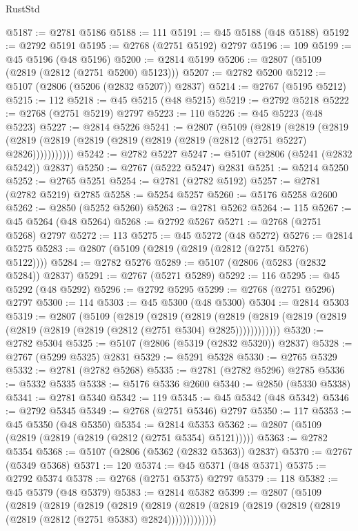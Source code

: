 \begin{lexlean}{RustStd}
\begin{coremodule}
@5187 := @2781 @5186
@5188 := 111
@5191 := @45 @5188 (@48 @5188)
@5192 := @2792 @5191
@5195 := @2768 (@2751 @5192) @2797
@5196 := 109
@5199 := @45 @5196 (@48 @5196)
@5200 := @2814 @5199
@5206 := @2807 (@5109 (@2819 (@2812 (@2751 @5200) @5123)))
@5207 := @2782 @5200
@5212 := @5107 (@2806 (@5206 (@2832 @5207)) @2837)
@5214 := @2767 (@5195 @5212)
@5215 := 112
@5218 := @45 @5215 (@48 @5215)
@5219 := @2792 @5218
@5222 := @2768 (@2751 @5219) @2797
@5223 := 110
@5226 := @45 @5223 (@48 @5223)
@5227 := @2814 @5226
@5241 := @2807
    (@5109
      (@2819
        (@2819
          (@2819 (@2819 (@2819 (@2819 (@2819 (@2819 (@2819 (@2812 (@2751 @5227) @2826)))))))))))
@5242 := @2782 @5227
@5247 := @5107 (@2806 (@5241 (@2832 @5242)) @2837)
@5250 := @2767 (@5222 @5247) @2831
@5251 := @5214 @5250
@5252 := @2765 @5251
@5254 := @2781 (@2782 @5192)
@5257 := @2781 (@2782 @5219) @2785
@5258 := @5254 @5257
@5260 := @5176 @5258 @2600
@5262 := @2850 (@5252 @5260)
@5263 := @2781 @5262
@5264 := 115
@5267 := @45 @5264 (@48 @5264)
@5268 := @2792 @5267
@5271 := @2768 (@2751 @5268) @2797
@5272 := 113
@5275 := @45 @5272 (@48 @5272)
@5276 := @2814 @5275
@5283 := @2807 (@5109 (@2819 (@2819 (@2812 (@2751 @5276) @5122))))
@5284 := @2782 @5276
@5289 := @5107 (@2806 (@5283 (@2832 @5284)) @2837)
@5291 := @2767 (@5271 @5289)
@5292 := 116
@5295 := @45 @5292 (@48 @5292)
@5296 := @2792 @5295
@5299 := @2768 (@2751 @5296) @2797
@5300 := 114
@5303 := @45 @5300 (@48 @5300)
@5304 := @2814 @5303
@5319 := @2807
    (@5109
      (@2819
        (@2819
          (@2819
            (@2819 (@2819 (@2819 (@2819 (@2819 (@2819 (@2819 (@2812 (@2751 @5304) @2825))))))))))))
@5320 := @2782 @5304
@5325 := @5107 (@2806 (@5319 (@2832 @5320)) @2837)
@5328 := @2767 (@5299 @5325) @2831
@5329 := @5291 @5328
@5330 := @2765 @5329
@5332 := @2781 (@2782 @5268)
@5335 := @2781 (@2782 @5296) @2785
@5336 := @5332 @5335
@5338 := @5176 @5336 @2600
@5340 := @2850 (@5330 @5338)
@5341 := @2781 @5340
@5342 := 119
@5345 := @45 @5342 (@48 @5342)
@5346 := @2792 @5345
@5349 := @2768 (@2751 @5346) @2797
@5350 := 117
@5353 := @45 @5350 (@48 @5350)
@5354 := @2814 @5353
@5362 := @2807 (@5109 (@2819 (@2819 (@2819 (@2812 (@2751 @5354) @5121)))))
@5363 := @2782 @5354
@5368 := @5107 (@2806 (@5362 (@2832 @5363)) @2837)
@5370 := @2767 (@5349 @5368)
@5371 := 120
@5374 := @45 @5371 (@48 @5371)
@5375 := @2792 @5374
@5378 := @2768 (@2751 @5375) @2797
@5379 := 118
@5382 := @45 @5379 (@48 @5379)
@5383 := @2814 @5382
@5399 := @2807
    (@5109
      (@2819
        (@2819
          (@2819
            (@2819
              (@2819
                (@2819 (@2819 (@2819 (@2819 (@2819 (@2819 (@2812 (@2751 @5383) @2824)))))))))))))

\end{coremodule}
\end{lexlean}
